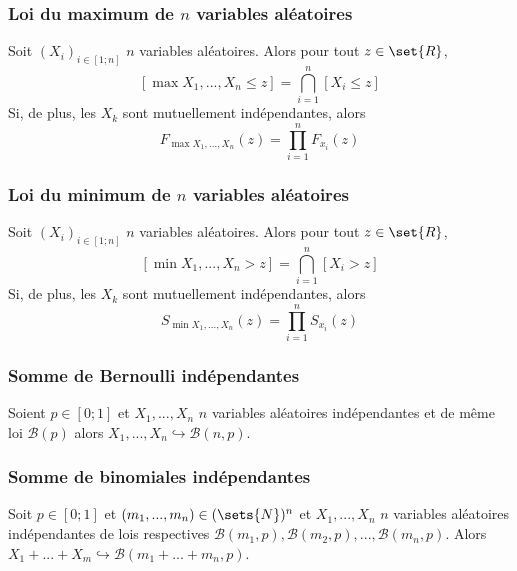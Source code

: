         \subsubsection{Loi du maximum de $n$ variables aléatoires}
            Soit $(X_i)_{i \in [1; n]}$ $n$ variables aléatoires. Alors pour tout $z \in \set{R}$,
            \[
                [\max{X_1, ..., X_n} \leq z] = \bigcap_{i = 1}^{n} [X_i \leq z]
            \]
            Si, de plus, les $X_k$ sont mutuellement indépendantes, alors
            \[
                F_{\max{X_1, ..., X_n}}(z) = \prod_{i = 1}^{n} F_{x_i}(z)
            \]

        \subsubsection{Loi du minimum de $n$ variables aléatoires}
            Soit $(X_i)_{i \in [1; n]}$ $n$ variables aléatoires. Alors pour tout $z \in \set{R}$,
            \[
                [\min{X_1, ..., X_n} > z] = \bigcap_{i = 1}^{n} [X_i > z]
            \]
            Si, de plus, les $X_k$ sont mutuellement indépendantes, alors
            \[
                S_{\min{X_1, ..., X_n}}(z) = \prod_{i = 1}^{n} S_{x_i}(z)
            \]
        
        \subsubsection{Somme de Bernoulli indépendantes}
            Soient $p \in [0; 1]$ et $X_1, ..., X_n$ $n$ variables aléatoires indépendantes et de même
            loi $\mathcal{B}(p)$ alors $X_1, ..., X_n \hookrightarrow \mathcal{B}(n,p)$.

        \subsubsection{Somme de binomiales indépendantes}
            Soit $p \in [0; 1]$ et $(m_1, ..., m_n) \in (\sets{N})^n$ et $X_1, ..., X_n$ $n$
            variables aléatoires indépendantes de lois respectives $\mathcal{B}(m_1,p), \mathcal{B}(m_2,p), ...,
            \mathcal{B}(m_n,p)$. Alors $X_1 + ... + X_m \hookrightarrow \mathcal{B}(m_1 + ... + m_n, p)$.
